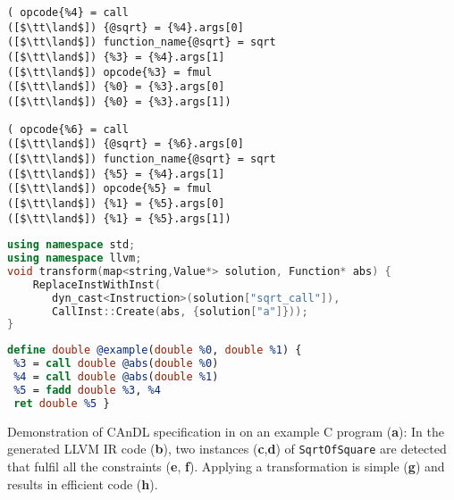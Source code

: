 \begin{minipage}[t]{\textwidth}
\begin{minipage}[t]{0.493\textwidth}
\centering
\vspace{-0.19cm}
\begin{lstlisting}[language=CAnDL,
                   numbers=none,framexleftmargin=0pt,xleftmargin=0pt,
                   captionpos=t,title=
   {{\bf(e)} {} Verification of first solution:}]
( opcode{%4} = call
([$\tt\land$]) {@sqrt} = {%4}.args[0]
([$\tt\land$]) function_name{@sqrt} = sqrt
([$\tt\land$]) {%3} = {%4}.args[1]
([$\tt\land$]) opcode{%3} = fmul
([$\tt\land$]) {%0} = {%3}.args[0]
([$\tt\land$]) {%0} = {%3}.args[1])
\end{lstlisting}
\end{minipage}
\hfill
\begin{minipage}[t]{0.493\textwidth}
\centering
\vspace{-0.19cm}
\begin{lstlisting}[language=CAnDL,
                   numbers=none,framexleftmargin=0pt,xleftmargin=0pt,
                   captionpos=t,title=
   {{\bf(f)} {} Verification of second solution:}]
( opcode{%6} = call
([$\tt\land$]) {@sqrt} = {%6}.args[0]
([$\tt\land$]) function_name{@sqrt} = sqrt
([$\tt\land$]) {%5} = {%4}.args[1]
([$\tt\land$]) opcode{%5} = fmul
([$\tt\land$]) {%1} = {%5}.args[0]
([$\tt\land$]) {%1} = {%5}.args[1])
\end{lstlisting}
\end{minipage}
\end{minipage}

\begin{minipage}[t]{\textwidth}
\centering
\vspace{-0.19cm}
\begin{lstlisting}[language=C++,captionpos=t,title=
   {{\bf(g)} {} C++ transformation code:}]
using namespace std;
using namespace llvm;
void transform(map<string,Value*> solution, Function* abs) {
    ReplaceInstWithInst(
       dyn_cast<Instruction>(solution["sqrt_call"]),
       CallInst::Create(abs, {solution["a"]}));
}
\end{lstlisting}
\end{minipage}

\begin{minipage}[t]{\textwidth}
\centering
\vspace{-0.19cm}
\begin{lstlisting}[language=LLVM,captionpos=t,title=
   {{\bf(h)} {} Transformed LLVM IR after dead code elimination:}]
define double @example(double %0, double %1) {              
 %3 = call double @abs(double %0) 
 %4 = call double @abs(double %1)
 %5 = fadd double %3, %4   
 ret double %5 }
\end{lstlisting}
\end{minipage}

\caption{Demonstration of CAnDL specification in 
         on an example C program ({\bf a}):
         In the generated LLVM IR code ({\bf b}), two instances
         ({\bf c},{\bf d}) of {\tt SqrtOfSquare} are detected that fulfil all
         the constraints ({\bf e}, {\bf f}).
         Applying a transformation is simple ({\bf g}) and results in efficient
         code ({\bf h}).\parfillskip=0pt}
